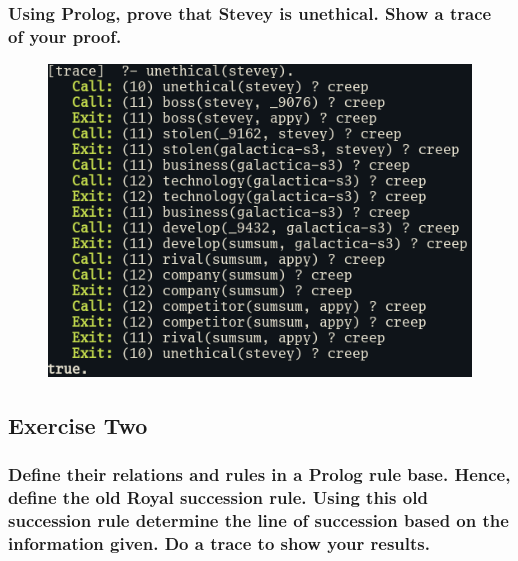 \documentclass{article}
\begin{document}
\subsubsection*{Using Prolog, prove that Stevey is unethical. Show a trace of your proof.}

\begin{figure}[H]
    \centering
    \includegraphics[width = \textwidth]{./1a.png}
\end{figure}

\subsection*{Exercise Two}

\subsubsection*{Define their relations and rules in a Prolog rule base. Hence, define the old Royal succession rule. Using this old succession rule determine the line of succession based on the information given. Do a trace to show your results.}
\end{document}
